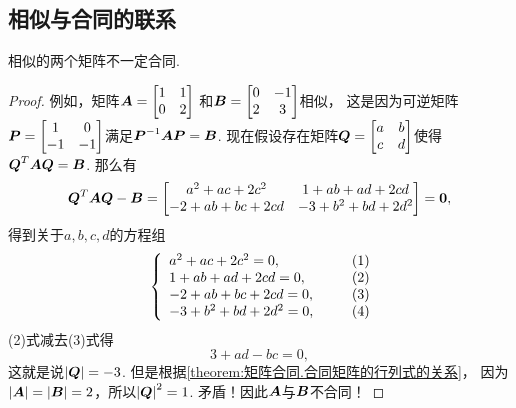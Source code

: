 \subsection{相似与合同的联系}
\begin{proposition}
相似的两个矩阵不一定合同.
\begin{proof}
例如，矩阵\(\boldsymbol{A}=\begin{bmatrix}
	1 & 1 \\
	0 & 2
\end{bmatrix}\)
和\(\boldsymbol{B}=\begin{bmatrix}
	0 & -1 \\
	2 & 3
\end{bmatrix}\)相似，
这是因为可逆矩阵\(\boldsymbol{P}=\begin{bmatrix}
	1 & 0 \\
	-1 & -1
\end{bmatrix}\)满足\(\boldsymbol{P}^{-1}\boldsymbol{A}\boldsymbol{P}=\boldsymbol{B}\).
现在假设存在矩阵\(\boldsymbol{Q}=\begin{bmatrix}
	a & b \\
	c & d
\end{bmatrix}\)使得\(\boldsymbol{Q}^T\boldsymbol{A}\boldsymbol{Q}=\boldsymbol{B}\).
那么有\begin{equation*}
	\boldsymbol{Q}^T\boldsymbol{A}\boldsymbol{Q}-\boldsymbol{B}
	=\begin{bmatrix}
		a^2+ac+2c^2 & 1+ab+ad+2cd \\
		-2+ab+bc+2cd & -3+b^2+bd+2d^2
	\end{bmatrix}
	=\boldsymbol0,
\end{equation*}
得到关于\(a,b,c,d\)的方程组
\begin{align*}
	\left\{ \begin{array}{l}
		a^2+ac+2c^2 = 0, \\
		1+ab+ad+2cd = 0, \\
		-2+ab+bc+2cd = 0, \\
		-3+b^2+bd+2d^2 = 0,
	\end{array} \right.
	\tag*{$\begin{matrix}(1)\\(2)\\(3)\\(4)\end{matrix}$}
\end{align*}
(2)式减去(3)式得\begin{equation*}
	3+ad-bc=0,
\end{equation*}
这就是说\(\abs{\boldsymbol{Q}}=-3\).
但是根据\cref{theorem:矩阵合同.合同矩阵的行列式的关系}，
因为\(\abs{\boldsymbol{A}}=\abs{\boldsymbol{B}}=2\)，所以\(\abs{\boldsymbol{Q}}^2=1\).
矛盾！因此\(\boldsymbol{A}\)与\(\boldsymbol{B}\)不合同！
\end{proof}
\end{proposition}

